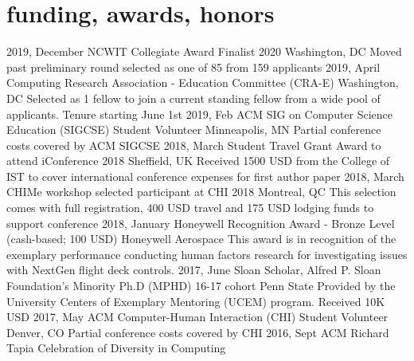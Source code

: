 \documentclass[]{cv-style}          %
\begin{document}

\section{funding, awards, honors}
\vspace{-0.2cm}
\begin{entrylist}
\entry
{2019, December}
{NCWIT Collegiate Award Finalist 2020
}
{Washington, DC}
{Moved past preliminary round selected as one of 85 from 159 applicants}
\entry
{2019, April}
{Computing Research Association - Education Committee (CRA-E)
}
{Washington, DC}
{Selected as 1 fellow to join a current standing fellow from a wide pool of applicants. Tenure starting June 1st}
\entry
{2019, Feb}
{ACM SIG on Computer Science Education (SIGCSE) Student Volunteer
}
{Minneapolis, MN}
{Partial conference costs covered by ACM SIGCSE}
\entry
{2018, March}
{Student Travel Grant Award to attend iConference 2018
}
{Sheffield, UK}
{Received 1500 USD from the College of IST to cover international conference expenses for first author paper}
\entry
{2018, March}
{CHIMe workshop selected participant at CHI 2018
}
{Montreal, QC}
{This selection comes with full registration, 400 USD travel and 175 USD lodging funds to support conference}
\entry
{2018, January}
{Honeywell Recognition Award - Bronze Level (cash-based; 100 USD)
}
{Honeywell Aerospace}
{This award is in recognition of the exemplary performance conducting human factors research for investigating issues with NextGen flight deck controls.}
\entry
{2017, June}
{Sloan Scholar, Alfred P. Sloan Foundation's Minority Ph.D (MPHD) 16-17 cohort
}
{Penn State}
{Provided by the University Centers of Exemplary Mentoring (UCEM) program. Received 10K USD}
\entry
{2017, May}
{ACM Computer-Human Interaction (CHI) Student Volunteer
}
{Denver, CO}
{Partial conference costs covered by CHI}
\entry
{2016, Sept}
{ACM Richard Tapia Celebration of Diversity in Computing
}
\end{entrylist}
\end{document}
